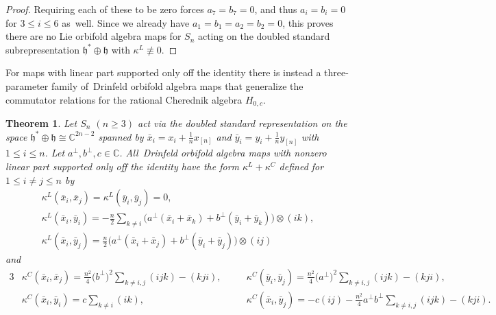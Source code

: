 \documentclass[pdftex]{sigma}
\numberwithin{equation}{section}
\newtheorem{Theorem}{Theorem}[section]
\begin{document}
\begin{proof}
Requiring each of these to be zero forces $a_7=b_7=0$, and thus $a_i=b_i=0$ for $3 \leq i \leq 6$
as~well. Since we already have $a_1=b_1=a_2=b_2=0$, this proves there are no
Lie orbifold algebra maps for $S_n$ acting on the doubled standard subrepresentation $\mathfrak{h}^* \oplus \mathfrak{h}$
with $\kappa^L \not\equiv 0$.
\end{proof}

For maps with linear part supported only off the identity there is instead a
three-parameter family of~Drinfeld orbifold algebra maps that generalize the
commutator relations for the rational Cherednik algebra $H_{0,c}$.

\begin{Theorem}
\label{thm:DOAMapsDoubledStd}
Let $S_n$ $(n \geq 3)$ act via the doubled standard representation on
the space $\mathfrak{h}^*\oplus\mathfrak{h} \cong \mathbb{C}^{2n-2}$ spanned by $\bar{x}_i=x_i+\frac{1}{n}x_{[n]}$ and $\bar{y}_i=y_i+\frac{1}{n}y_{[n]}$ with $1\leq i \leq n$. %
Let $a^\perp,b^\perp,c \in \mathbb{C}$.
All~Drinfeld orbifold algebra maps with
nonzero linear part supported only off the identity have the form
$\kappa^L+\kappa^C$
defined for $1 \leq i \neq j \leq n$ by
\begin{gather*}
\kappa^L(\bar{x}_i,\bar{x}_j)=\kappa^L(\bar{y}_i,\bar{y}_j)=0, \\
\kappa^L(\bar{x}_i,\bar{y}_i)=-\frac{n}{2}\sum\limits_{k\neq i} \big(a^\perp(\bar{x}_{i}+\bar{x}_{k})+b^\perp(\bar{y}_{i}+\bar{y}_{k})\big) \otimes (ik), \\
\kappa^L(\bar{x}_i,\bar{y}_j)=\frac{n}{2}\big(a^\perp (\bar{x}_{i}+\bar{x}_{j})+b^\perp(\bar{y}_{i}+\bar{y}_{j})\big) \otimes (ij)
\end{gather*}
and
\begin{alignat*}{3}
& \kappa^C(\bar{x}_i,\bar{x}_j)=\frac{n^2}{4}\big(b^\perp\big)^2 \sum\limits_{k\neq i,j} (ijk)-(kji), \quad&&
\kappa^C(\bar{y}_i,\bar{y}_j)=\frac{n^2}{4}\big(a^\perp\big)^2 \sum\limits_{k\neq i,j} (ijk)-(kji),& \\
&\kappa^C(\bar{x}_i,\bar{y}_i)=c\sum\limits_{k\neq i} (ik), \quad&&
\kappa^C(\bar{x}_i,\bar{y}_j)=-c(ij)-\frac{n^2}{4}a^\perp b^\perp\sum\limits_{k\neq i,j} (ijk)-(kji).&
\end{alignat*}
\end{Theorem}
\end{document}

